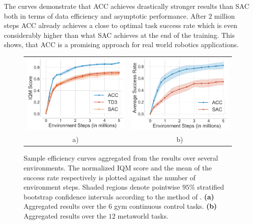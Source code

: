 The curves demonstrate that ACC achieves drastically stronger results than SAC both in terms of data efficiency and asymptotic performance.
After $2$ million steps ACC already achieves a close to optimal task success rate which is even considerably higher than what SAC achieves at the end of the training.
This shows, that ACC is a promising approach for real world robotics applications.

\begin{figure}[t]
\footnotesize
\setlength{\tabcolsep}{1pt}
\centering 
\begin{tabular}{cc}
        \includegraphics[width=.49\linewidth]{images/main_exp/sac_td3_acc_aggregated_0-eps-converted-to.pdf} &
        \includegraphics[width= .49\linewidth]{images/main_exp/meta_world_aggregated_mean_std_0-eps-converted-to.pdf} \\
        a) & b) \\
\end{tabular}
\vspace{-0.3cm}
\caption{
Sample efficiency curves aggregated from the results over several environments. The normalized IQM score and the mean of the success rate respectively is plotted against the number of environment steps. Shaded regions denote pointwise $95$\% stratified bootstrap confidence intervals according to the method of \cite{agarwal2021deep}. 
\textbf{(a)} Aggregated results over the $6$ gym continuous control tasks.
\textbf{(b)} Aggregated results over the $12$ metaworld tasks.
}
\label{fig:comparative_aggregated_results}
\vspace{-0.5cm}
\end{figure}


